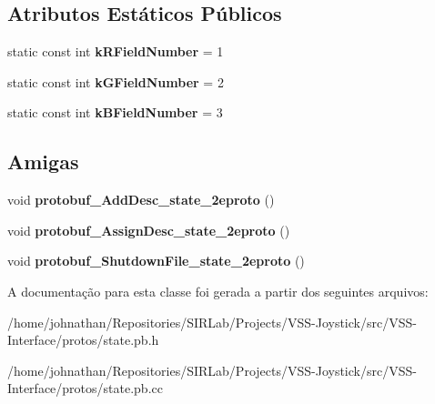 \subsection*{Atributos Estáticos Públicos}
\begin{DoxyCompactItemize}
\item 
static const int {\bfseries k\+R\+Field\+Number} = 1\hypertarget{classvss__state_1_1RGB_a6b14019e7583f983a0dc0e0c713767e5}{}\label{classvss__state_1_1RGB_a6b14019e7583f983a0dc0e0c713767e5}

\item 
static const int {\bfseries k\+G\+Field\+Number} = 2\hypertarget{classvss__state_1_1RGB_a7f4f93a87024582ed9aa94ad501aacc0}{}\label{classvss__state_1_1RGB_a7f4f93a87024582ed9aa94ad501aacc0}

\item 
static const int {\bfseries k\+B\+Field\+Number} = 3\hypertarget{classvss__state_1_1RGB_a2c4583771ba2ee5b0f6798c7ee082b3e}{}\label{classvss__state_1_1RGB_a2c4583771ba2ee5b0f6798c7ee082b3e}

\end{DoxyCompactItemize}
\subsection*{Amigas}
\begin{DoxyCompactItemize}
\item 
void {\bfseries protobuf\+\_\+\+Add\+Desc\+\_\+state\+\_\+2eproto} ()\hypertarget{classvss__state_1_1RGB_aab1a2c258f8122a403a979ff57e2a706}{}\label{classvss__state_1_1RGB_aab1a2c258f8122a403a979ff57e2a706}

\item 
void {\bfseries protobuf\+\_\+\+Assign\+Desc\+\_\+state\+\_\+2eproto} ()\hypertarget{classvss__state_1_1RGB_a57d9367bc8a7a94ead11d11194cca1b6}{}\label{classvss__state_1_1RGB_a57d9367bc8a7a94ead11d11194cca1b6}

\item 
void {\bfseries protobuf\+\_\+\+Shutdown\+File\+\_\+state\+\_\+2eproto} ()\hypertarget{classvss__state_1_1RGB_a4e6dc5e8e72799859c4e9556d090e57d}{}\label{classvss__state_1_1RGB_a4e6dc5e8e72799859c4e9556d090e57d}

\end{DoxyCompactItemize}


A documentação para esta classe foi gerada a partir dos seguintes arquivos\+:\begin{DoxyCompactItemize}
\item 
/home/johnathan/\+Repositories/\+S\+I\+R\+Lab/\+Projects/\+V\+S\+S-\/\+Joystick/src/\+V\+S\+S-\/\+Interface/protos/state.\+pb.\+h\item 
/home/johnathan/\+Repositories/\+S\+I\+R\+Lab/\+Projects/\+V\+S\+S-\/\+Joystick/src/\+V\+S\+S-\/\+Interface/protos/state.\+pb.\+cc\end{DoxyCompactItemize}
